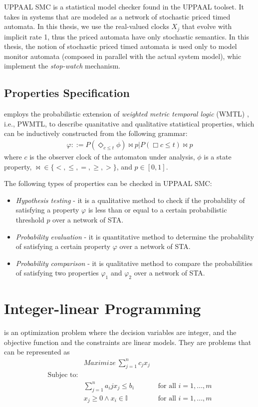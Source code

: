 UPPAAL SMC is a statistical model checker found in the UPPAAL toolset. It takes in systems that are modeled as a network of stochastic priced timed automata. In this thesis, we use the real-valued clocks $X_j$ that evolve with implicit rate 1, thus the priced automata have only stochastic semantics. In this thesis, the notion of stochastic priced timed automata is used only to model monitor automata (composed in parallel with the actual system model), whic implement the \emph{stop-watch} mechanism.

\subsection*{Properties Specification}
\uppaalsmc{} employs the probabilistic extension of \textit{weighted metric temporal logic} (WMTL) \cite{bulychev2012rewrite}, i.e., PWMTL, to describe quanitative and qualitative statistical properties, which can be inductively constructed from the following grammar:
\begin{align}
\varphi::=P(\Diamond_{c\leq t}\phi)\bowtie p | P(\Box c\leq t)\bowtie p
\end{align}
where $c$ is the observer clock of the automaton under analysis, $\phi$ is a state property, $\bowtie \in\{<, \leq, =,\geq, >\}$, and $p \in [0, 1]$.

The following types of properties can be checked in UPPAAL SMC: 
\begin{itemize}
	\item \textit{Hypothesis testing} - it is a qualitative method to check if the probability of satisfying a property $\varphi$ is less than or equal to a certain probabilistic threshold $p$ over a network of STA.
	\item \textit{Probability evaluation} - it is quantitative method to determine the probability of satisfying a certain property $\varphi$ over a network of STA.
	\item \textit{Probability comparison} - it is qualitative method to compare the probabilities of satisfying two properties $\varphi_1$ and $\varphi_2$ over a network of STA.
\end{itemize}

\section{Integer-linear Programming}
\ilp{} is an optimization problem where the decision variables are integer, and the objective function and the constraints are linear models.  They are problems that can be represented as 
\begin{align}
	&Maximize\ \sum_{j=1}^{n}{c_jx_j}\\
	\mbox{Subjec to:}&\\
	&\sum_{j=1}^n{a_ijx_j}\leq b_i&\mbox{ for all } i=1,...,m\\
	&x_j\geq 0 \land x_i\in \mathbb{I} &\mbox{ for all } i=1,...,m
\end{align}

